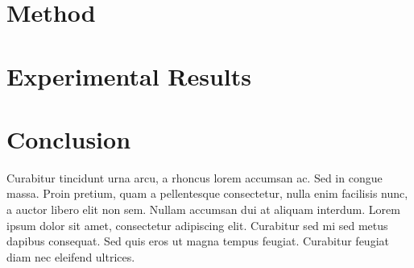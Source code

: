 \documentclass{article}
\begin{document}
\section{Method} 



\section{Experimental Results}

\section{Conclusion} 
Curabitur tincidunt urna arcu, a rhoncus lorem accumsan ac. Sed in congue massa. Proin pretium, quam a pellentesque consectetur, nulla enim facilisis nunc, a auctor libero elit non sem. Nullam accumsan dui at aliquam interdum. Lorem ipsum dolor sit amet, consectetur adipiscing elit. Curabitur sed mi sed metus dapibus consequat. Sed quis eros ut magna tempus feugiat. Curabitur feugiat diam nec eleifend ultrices.



\clearpage


\end{document}

